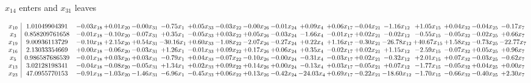 \documentclass[9pt]{article}
\begin{document}
 $ x_{14} $ enters and $ x_{31} $ leaves 

 \[\begin{array}{c| c c@{\hskip 2pt} c@{\hskip 2pt} c@{\hskip 2pt} c@{\hskip 2pt} c@{\hskip 2pt} c@{\hskip 2pt} c@{\hskip 2pt} c@{\hskip 2pt} c@{\hskip 2pt} c@{\hskip 2pt} c@{\hskip 2pt} c@{\hskip 2pt} c@{\hskip 2pt} c@{\hskip 2pt} c@{\hskip 2pt} c@{\hskip 2pt} }
 x_{10}   &  1.01049904391 & -0.03 x_{18} & +  0.01 x_{20} & -0.00 x_{31} & -0.75 x_{1} & +  0.05 x_{33} & -0.03 x_{22} & -0.00 x_{26} & -0.01 x_{24} & +  0.09 x_{4} & +  0.06 x_{17} & -0.04 x_{21} & -1.16 x_{12} & +  1.05 x_{15} & +  0.04 x_{32} & -0.04 x_{25} & -0.17 x_{7}\\
 x_{3}   &  0.858209761658 & -0.01 x_{18} & -0.10 x_{20} & -0.07 x_{31} & +  0.35 x_{1} & -0.05 x_{33} & +  0.03 x_{22} & +  0.05 x_{26} & -0.03 x_{24} & -1.66 x_{4} & -0.01 x_{17} & +  0.02 x_{21} & -0.02 x_{12} & -0.55 x_{15} & -0.05 x_{32} & -0.02 x_{25} & +  0.66 x_{7}\\
 x_{19}   &  9.00936113729 & -0.10 x_{18} & +  2.15 x_{20} & +  0.54 x_{31} & -30.16 x_{1} & +  0.60 x_{33} & -1.08 x_{22} & -2.07 x_{26} & -0.27 x_{24} & +  0.22 x_{4} & +  1.16 x_{17} & -0.30 x_{21} & -26.78 x_{12} & + 40.67 x_{15} & +  1.58 x_{32} & -0.73 x_{25} & -22.77 x_{7}\\
 x_{16}   &  2.13033354669 & +  0.00 x_{18} & -0.06 x_{20} & -0.03 x_{31} & +  1.26 x_{1} & -0.01 x_{33} & +  0.09 x_{22} & +  0.17 x_{26} & +  0.06 x_{24} & +  0.35 x_{4} & -0.02 x_{17} & +  0.02 x_{21} & +  1.15 x_{12} & -2.59 x_{15} & -0.07 x_{32} & +  0.05 x_{25} & +  0.96 x_{7}\\
 x_{5}   &  0.986587686539 & -0.01 x_{18} & +  0.03 x_{20} & +  0.03 x_{31} & -0.79 x_{1} & +  0.04 x_{33} & -0.07 x_{22} & -0.10 x_{26} & -0.00 x_{24} & -0.31 x_{4} & -0.03 x_{17} & +  0.02 x_{21} & -0.32 x_{12} & +  2.01 x_{15} & +  0.07 x_{32} & -0.03 x_{25} & -0.62 x_{7}\\
 x_{13}   &  3.02128198341 & -0.04 x_{18} & -0.08 x_{20} & -0.05 x_{31} & +  1.34 x_{1} & +  0.02 x_{33} & +  0.09 x_{22} & +  0.14 x_{26} & +  0.00 x_{24} & -0.13 x_{4} & +  0.03 x_{17} & -0.05 x_{21} & +  0.07 x_{12} & -1.77 x_{15} & -0.05 x_{32} & +  0.04 x_{25} & +  0.00 x_{7}\\
 x_{23}   &  47.0955770153 & -0.91 x_{18} & -1.03 x_{20} & -1.46 x_{31} & -6.96 x_{1} & -0.45 x_{33} & +  0.06 x_{22} & +  0.13 x_{26} & -0.42 x_{24} & -24.03 x_{4} & +  0.69 x_{17} & -0.22 x_{21} & -18.60 x_{12} & -1.70 x_{15} & -0.66 x_{32} & -0.40 x_{25} & +  2.30 x_{7}\\

\end{array}\]
\end{document}

